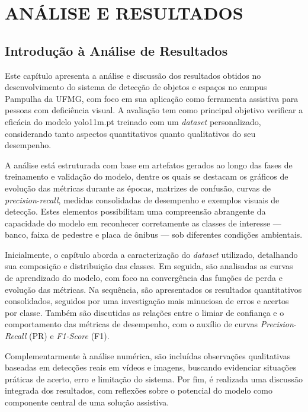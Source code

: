 \chapter{\textbf{ANÁLISE E RESULTADOS}}
\section{\textbf{Introdução à Análise de Resultados}}

Este capítulo apresenta a análise e discussão dos resultados obtidos no desenvolvimento do sistema de detecção de objetos e espaços no campus Pampulha da UFMG, com foco em sua aplicação como ferramenta assistiva para pessoas com deficiência visual. A avaliação tem como principal objetivo verificar a eficácia do modelo yolo11m.pt treinado com um \textit{dataset} personalizado, considerando tanto aspectos quantitativos quanto qualitativos do seu desempenho.

A análise está estruturada com base em artefatos gerados ao longo das fases de treinamento e validação do modelo, dentre os quais se destacam os gráficos de evolução das métricas durante as épocas, matrizes de confusão, curvas de \textit{precision}-\textit{recall}, medidas consolidadas de desempenho e exemplos visuais de detecção. Estes elementos possibilitam uma compreensão abrangente da capacidade do modelo em reconhecer corretamente as classes de interesse — banco, faixa de pedestre e placa de ônibus — sob diferentes condições ambientais.

Inicialmente, o capítulo aborda a caracterização do \textit{dataset} utilizado, detalhando sua composição e distribuição das classes. Em seguida, são analisadas as curvas de aprendizado do modelo, com foco na convergência das funções de perda e evolução das métricas. Na sequência, são apresentados os resultados quantitativos consolidados, seguidos por uma investigação mais minuciosa de erros e acertos por classe. Também são discutidas as relações entre o limiar de confiança e o comportamento das métricas de desempenho, com o auxílio de curvas \textit{Precision}-\textit{Recall} (PR) e \textit{F1-Score} (F1).

Complementarmente à análise numérica, são incluídas observações qualitativas baseadas em detecções reais em vídeos e imagens, buscando evidenciar situações práticas de acerto, erro e limitação do sistema. Por fim, é realizada uma discussão integrada dos resultados, com reflexões sobre o potencial do modelo como componente central de uma solução assistiva.

